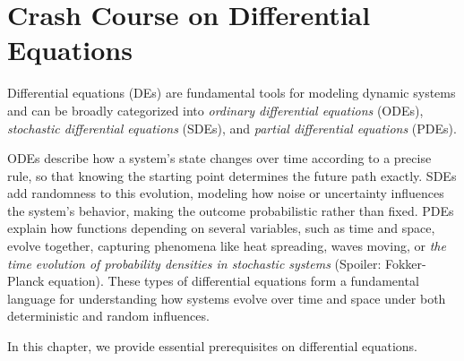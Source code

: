 \chapter{Crash Course on Differential Equations}\label{app:de}

Differential equations (DEs) are fundamental tools for modeling dynamic systems and can be broadly categorized into \emph{ordinary differential equations} (ODEs), \emph{stochastic differential equations} (SDEs), and \emph{partial differential equations} (PDEs). 

ODEs describe how a system’s state changes over time according to a precise rule, so that knowing the starting point determines the future path exactly. SDEs add randomness to this evolution, modeling how noise or uncertainty influences the system’s behavior, making the outcome probabilistic rather than fixed. PDEs explain how functions depending on several variables, such as time and space, evolve together, capturing phenomena like heat spreading, waves moving, or \emph{the time evolution of probability densities in stochastic systems} (Spoiler: Fokker-Planck equation). These types of differential equations form a fundamental language for understanding how systems evolve over time and space under both deterministic and random influences.

In this chapter, we provide essential prerequisites on differential equations.

\clearpage
\newpage

